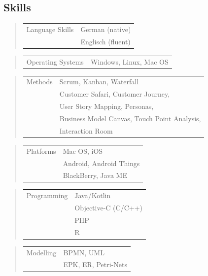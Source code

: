 \subsection*{Skills}
%
\ifshowKenntnisseSprachen
\begin{quote}
	\begin{tabular}{p{4cm}l}
		Language Skills&German (native)\\
		&Englisch (fluent)\\
	\end{tabular}
\end{quote}
\fi
%
\ifshowKenntnisseOS
\begin{quote}
	\begin{tabular}{p{4cm}l}
		Operating Systems&Windows, Linux, Mac OS
	\end{tabular}
\end{quote}
\fi
%
\ifshowKenntnisseMethoden
\begin{quote}
	\begin{tabular}{p{4cm}l}
		Methods&Scrum, Kanban, Waterfall\\
		&Customer Safari, Customer Journey,\\
		&User Story Mapping, Personas,\\
		&Business Model Canvas, Touch Point Analysis,\\
		&Interaction Room
	\end{tabular}
\end{quote}
%
\ifshowKenntnissePlattformen
\begin{quote}
	\begin{tabular}{p{4cm}l}
		Platforms&Mac OS, iOS\\
		&Android, Android Things\\
		&BlackBerry, Java ME
	\end{tabular}
\end{quote}
\fi
%
\ifshowKenntnisseProgSpr
\begin{quote}
	\begin{tabular}{p{4cm}l}
			Programming&Java/Kotlin\\
			&Objective-C (C/C++)\\
			&PHP\\
			&R
		\end{tabular}
	\end{quote}
\begin{quote}
	\begin{tabular}{p{4cm}l}
			Modelling&BPMN, UML\\
			&EPK, ER, Petri-Nets
		\end{tabular}
	\end{quote}
